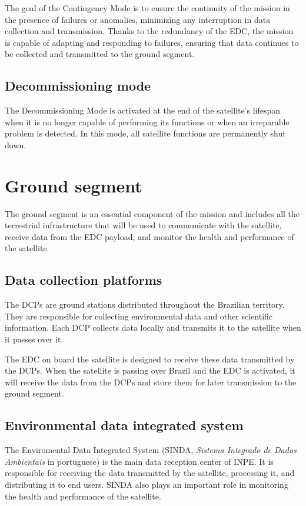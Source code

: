 The goal of the Contingency Mode is to ensure the continuity of the mission in the presence of failures or anomalies, minimizing any interruption in data collection and transmission. Thanks to the redundancy of the EDC, the mission is capable of adapting and responding to failures, ensuring that data continues to be collected and transmitted to the ground segment.

\subsection{Decommissioning mode}

The Decommissioning Mode is activated at the end of the satellite's lifespan when it is no longer capable of performing its functions or when an irreparable problem is detected. In this mode, all satellite functions are permanently shut down.

\section{Ground segment}

The ground segment is an essential component of the mission and includes all the terrestrial infrastructure that will be used to communicate with the satellite, receive data from the EDC payload, and monitor the health and performance of the satellite.

\subsection{Data collection platforms}

The DCPs are ground stations distributed throughout the Brazilian territory. They are responsible for collecting environmental data and other scientific information. Each DCP collects data locally and transmits it to the satellite when it passes over it.

The EDC on board the satellite is designed to receive these data transmitted by the DCPs. When the satellite is passing over Brazil and the EDC is activated, it will receive the data from the DCPs and store them for later transmission to the ground segment.

\subsection{Environmental data integrated system}

The Enviromental Data Integrated System (SINDA, \textit{Sistema Integrado de Dados Ambientais} in portuguese) is the main data reception center of INPE. It is responsible for receiving the data transmitted by the satellite, processing it, and distributing it to end users. SINDA also plays an important role in monitoring the health and performance of the satellite.

